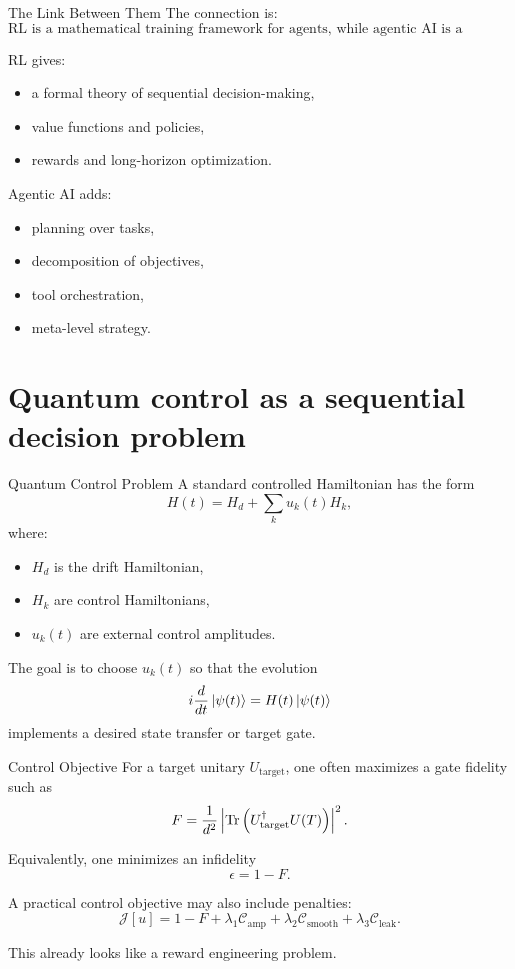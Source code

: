 \documentclass[aspectratio=169]{beamer}
\begin{document}
\begin{frame}{The Link Between Them}
The connection is:
\[
\boxed{
\text{RL is a mathematical training framework for agents, while agentic AI is a broader system architecture for autonomous goal-directed behavior.}
}
\]

RL gives:
\begin{itemize}
    \item a formal theory of sequential decision-making,
    \item value functions and policies,
    \item rewards and long-horizon optimization.
\end{itemize}

Agentic AI adds:
\begin{itemize}
    \item planning over tasks,
    \item decomposition of objectives,
    \item tool orchestration,
    \item meta-level strategy.
\end{itemize}
\end{frame}

\section{Quantum control as a sequential decision problem}

\begin{frame}{Quantum Control Problem}
A standard controlled Hamiltonian has the form
\[
H(t)=H_d+\sum_{k} u_k(t) H_k,
\]
where:
\begin{itemize}
    \item \(H_d\) is the drift Hamiltonian,
    \item \(H_k\) are control Hamiltonians,
    \item \(u_k(t)\) are external control amplitudes.
\end{itemize}

The goal is to choose \(u_k(t)\) so that the evolution
\[
i\frac{d}{dt}\ket{\psi(t)} = H(t)\ket{\psi(t)}
\]
implements a desired state transfer or target gate.
\end{frame}

\begin{frame}{Control Objective}
For a target unitary \(U_{\mathrm{target}}\), one often maximizes a gate fidelity such as
\[
F = \frac{1}{d^2}\left|\Tr\left(U_{\mathrm{target}}^\dagger U(T)\right)\right|^2.
\]

Equivalently, one minimizes an infidelity
\[
\epsilon = 1-F.
\]

A practical control objective may also include penalties:
\[
\mathcal{J}[u]
=
1-F
+ \lambda_1 \mathcal{C}_{\mathrm{amp}}
+ \lambda_2 \mathcal{C}_{\mathrm{smooth}}
+ \lambda_3 \mathcal{C}_{\mathrm{leak}}.
\]

This already looks like a reward engineering problem.
\end{frame}
\end{document}
